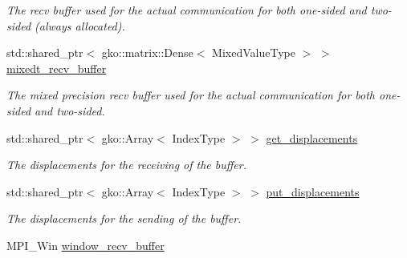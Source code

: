 \begin{DoxyCompactItemize}
\begin{DoxyCompactList}\small\item\em The recv buffer used for the actual communication for both one-\/sided and two-\/sided (always allocated). \end{DoxyCompactList}\item 
\mbox{\label{structschwz_1_1Communicate_1_1comm__struct_a93ca78673122ad09e24bebd0b1ec9750}} 
std\+::shared\+\_\+ptr$<$ gko\+::matrix\+::\+Dense$<$ Mixed\+Value\+Type $>$ $>$ \hyperlink{structschwz_1_1Communicate_1_1comm__struct_a93ca78673122ad09e24bebd0b1ec9750}{mixedt\+\_\+recv\+\_\+buffer}
\begin{DoxyCompactList}\small\item\em The mixed precision recv buffer used for the actual communication for both one-\/sided and two-\/sided. \end{DoxyCompactList}\item 
\mbox{\label{structschwz_1_1Communicate_1_1comm__struct_aa9d510fb291e896fa14fe3e0f00f0454}} 
std\+::shared\+\_\+ptr$<$ gko\+::\+Array$<$ Index\+Type $>$ $>$ \hyperlink{structschwz_1_1Communicate_1_1comm__struct_aa9d510fb291e896fa14fe3e0f00f0454}{get\+\_\+displacements}
\begin{DoxyCompactList}\small\item\em The displacements for the receiving of the buffer. \end{DoxyCompactList}\item 
\mbox{\label{structschwz_1_1Communicate_1_1comm__struct_abb06062ad6fddb9d0399625f4d799d08}} 
std\+::shared\+\_\+ptr$<$ gko\+::\+Array$<$ Index\+Type $>$ $>$ \hyperlink{structschwz_1_1Communicate_1_1comm__struct_abb06062ad6fddb9d0399625f4d799d08}{put\+\_\+displacements}
\begin{DoxyCompactList}\small\item\em The displacements for the sending of the buffer. \end{DoxyCompactList}\item 
\mbox{\label{structschwz_1_1Communicate_1_1comm__struct_a6257c71a7ebf30ecfc390059ceef0e1f}} 
M\+P\+I\+\_\+\+Win \hyperlink{structschwz_1_1Communicate_1_1comm__struct_a6257c71a7ebf30ecfc390059ceef0e1f}{window\+\_\+recv\+\_\+buffer}

\end{DoxyCompactItemize}
